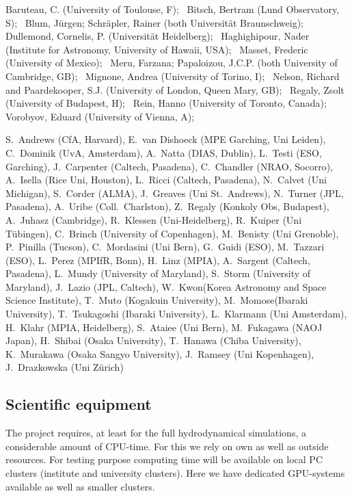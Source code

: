 \documentclass[10pt,fleqn,twoside]{article}
\begin{document}
Baruteau, C. (University of Toulouse, F); \,
Bitsch, Bertram (Lund Observatory, S); \,
Blum, J\"urgen; Schr\"apler, Rainer (both Universit\"at Braunschweig); \,
Dullemond, Cornelis, P. (Universit\"at Heidelberg); \,
Haghighipour, Nader (Institute for Astronomy, University of Hawaii, USA); \,
Masset, Frederic (University of Mexico); \,
Meru, Farzana; Papaloizou, J.C.P. (both University of Cambridge, GB); \,
Mignone, Andrea (University of Torino, I); \,
Nelson, Richard and Paardekooper, S.J. (University of London, Queen Mary, GB); \,
Regaly, Zsolt (University of Budapest, H); \,
Rein, Hanno (University of Toronto, Canada); \,
Vorobyov, Eduard (University of Vienna, A); \,

S.~Andrews (CfA, Harvard),
E.~van Dishoeck (MPE Garching, Uni Leiden),
C.~Dominik (UvA, Amsterdam),
A.~Natta (DIAS, Dublin),
L.~Testi (ESO, Garching),
J.~Carpenter (Caltech, Pasadena),
C.~Chandler (NRAO, Socorro),
A.~Isella (Rice Uni, Houston),
L.~Ricci (Caltech, Pasadena),
N.~Calvet (Uni Michigan),
S.~Corder (ALMA),
J.~Greaves (Uni St.~Andrews),
N.~Turner (JPL, Pasadena),
A.~Uribe (Coll.~Charlston),
Z.~Regaly (Konkoly Obs, Budapest),
A.~Juhasz (Cambridge),
R.~Klessen (Uni-Heidelberg),
R.~Kuiper (Uni T\"ubingen),
C.~Brinch (University of Copenhagen),
M.~Benisty (Uni Grenoble),
P.~Pinilla (Tucson),
C.~Mordasini (Uni Bern),
G.~Guidi (ESO),
M.~Tazzari (ESO),
L.~Perez (MPIfR, Bonn),
H.~Linz (MPIA),
A.~Sargent (Caltech, Pasadena),
L.~Mundy (University of Maryland),
S.~Storm (University of Maryland),
J.~Lazio (JPL, Caltech),
W.~Kwon(Korea Astronomy and Space Science Institute),
T.~Muto (Kogakuin University),
M.~Momose(Ibaraki University),
T.~Tsukagoshi (Ibaraki University),
L.~Klarmann (Uni Amsterdam),
H.~Klahr (MPIA, Heidelberg),
S.~Ataiee (Uni Bern),
M.~Fukagawa (NAOJ Japan),
H.~Shibai (Osaka University),
T.~Hanawa (Chiba University),
K.~Murakawa (Osaka Sangyo University),
J.~Ramsey (Uni Kopenhagen),
J.~Drazkowska (Uni Z\"urich)


\subsection{Scientific equipment}
\label{sec:computers}
The project requires, at least for the full hydrodynamical simulations, a
considerable amount of CPU-time.  For this we rely on own as well as outside
resources.  For testing purpose computing time will be available on local PC
clusters (institute and university clusters).  Here we have dedicated
GPU-systems available as well as smaller clusters.
\end{document}
